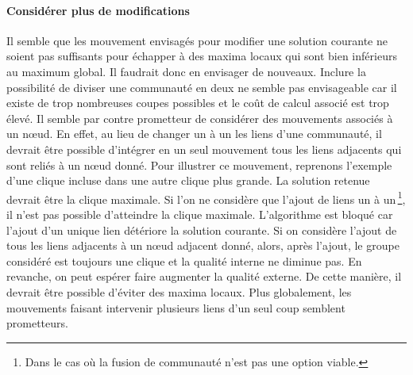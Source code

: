 \paragraph{Considérer plus de modifications}
Il semble que les mouvement envisagés pour modifier une solution courante ne soient pas suffisants pour échapper à des maxima locaux qui sont bien inférieurs au maximum global.
Il faudrait donc en envisager de nouveaux.
Inclure la possibilité de diviser une communauté en deux ne semble pas envisageable car il existe de trop nombreuses coupes possibles et le coût de calcul associé est trop élevé.
Il semble par contre prometteur de considérer des mouvements associés à un n\oe{}ud.
En effet, au lieu de changer un à un les liens d'une communauté, il devrait être possible d'intégrer en un seul mouvement tous les liens adjacents qui sont reliés à un n\oe{}ud donné.
Pour illustrer ce mouvement, reprenons l'exemple d'une clique incluse dans une autre clique plus grande.
La solution retenue devrait être la clique maximale.
Si l'on ne considère que l'ajout de liens un à un\,\footnote{Dans le cas où la fusion de communauté n'est pas une option viable.}, il n'est pas possible d'atteindre la clique maximale.
L'algorithme est bloqué car l'ajout d'un unique lien détériore la solution courante.
Si on considère l'ajout de tous les liens adjacents à un n\oe{}ud adjacent donné, alors, après l'ajout, le groupe considéré est toujours une clique et la qualité interne ne diminue pas.
En revanche, on peut espérer faire augmenter la qualité externe.
De cette manière, il devrait être possible d'éviter des maxima locaux.
Plus globalement, les mouvements faisant intervenir plusieurs liens d'un seul coup semblent prometteurs.



